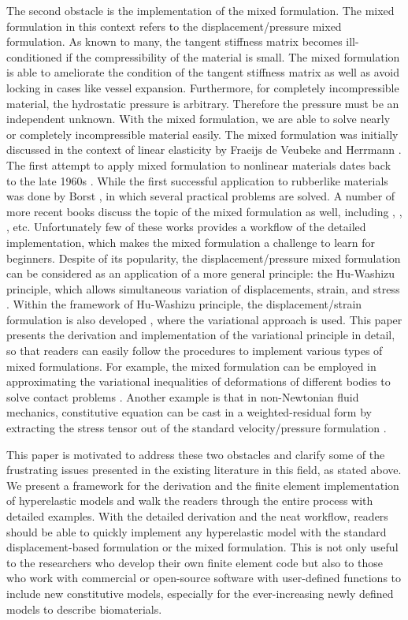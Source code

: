 The second obstacle is the implementation of the mixed formulation. The mixed formulation in this context  refers to the displacement/pressure mixed formulation. As known to many, the tangent stiffness matrix becomes ill-conditioned if the compressibility of the material is small. The mixed formulation is able to ameliorate the condition of the tangent stiffness matrix as well as avoid locking in cases like vessel expansion. Furthermore, for completely incompressible material, the hydrostatic pressure is arbitrary. Therefore the pressure must be an independent unknown. With the mixed formulation, we are able to solve nearly or completely incompressible material easily. 
The mixed formulation was initially discussed in the context of linear elasticity by Fraeijs de Veubeke \cite{Veubeke} and Herrmann \cite{Herrmann}. The first attempt to apply mixed formulation to nonlinear materials dates back to the late 1960s \cite{Oden}. While the first successful application to rubberlike materials was done by Borst \cite{Borst}, in which several practical problems are solved. A number of more recent books discuss the topic of the mixed formulation as well, including \cite{Bathe}, \cite{Holzapfel}, \cite{Zienkiewicz}, etc. Unfortunately few of these works provides a workflow of the detailed implementation, which makes the mixed formulation a challenge to learn for beginners. Despite of its popularity, the displacement/pressure mixed formulation can be considered as an application of a more general principle: the Hu-Washizu principle, which allows simultaneous variation of displacements, strain, and stress \cite{Hu}. Within the framework of Hu-Washizu principle, the displacement/strain formulation is also developed \cite{Cervera, Rifai}, where the variational approach is used. This paper presents the derivation and implementation of the variational principle in detail, so that readers can easily follow the procedures to implement various types of mixed formulations. For example, the mixed formulation can be employed in approximating the variational inequalities of deformations of different bodies to solve contact problems \cite{Taylor}. Another example is that in non-Newtonian fluid mechanics, constitutive equation can be cast in a weighted-residual form by extracting the stress tensor out of the standard velocity/pressure formulation \cite{Baaijens}. 

This paper is motivated to address these two obstacles and clarify some of the frustrating issues presented in the existing literature in this field, as stated above. We present a framework for the derivation and the finite element implementation of hyperelastic models and walk the readers through the entire process with detailed examples. With the detailed derivation and the neat workflow, readers should be able to quickly implement any hyperelastic model with the standard displacement-based formulation or the mixed formulation. This is not only useful to the researchers who develop their own finite element code but also to those who work with commercial or open-source software with user-defined functions to include new constitutive models, especially for the ever-increasing newly defined models to describe biomaterials.


